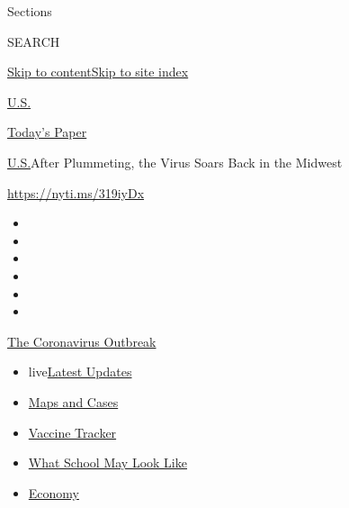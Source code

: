 Sections

SEARCH

\protect\hyperlink{site-content}{Skip to
content}\protect\hyperlink{site-index}{Skip to site index}

\href{https://www.nytimes3xbfgragh.onion/section/us}{U.S.}

\href{https://myaccount.nytimes3xbfgragh.onion/auth/login?response_type=cookie\&client_id=vi}{}

\href{https://www.nytimes3xbfgragh.onion/section/todayspaper}{Today's
Paper}

\href{/section/us}{U.S.}\textbar{}After Plummeting, the Virus Soars Back
in the Midwest

\url{https://nyti.ms/319iyDx}

\begin{itemize}
\item
\item
\item
\item
\item
\item
\end{itemize}

\href{https://www.nytimes3xbfgragh.onion/news-event/coronavirus?action=click\&pgtype=Article\&state=default\&region=TOP_BANNER\&context=storylines_menu}{The
Coronavirus Outbreak}

\begin{itemize}
\tightlist
\item
  live\href{https://www.nytimes3xbfgragh.onion/2020/08/01/world/coronavirus-covid-19.html?action=click\&pgtype=Article\&state=default\&region=TOP_BANNER\&context=storylines_menu}{Latest
  Updates}
\item
  \href{https://www.nytimes3xbfgragh.onion/interactive/2020/us/coronavirus-us-cases.html?action=click\&pgtype=Article\&state=default\&region=TOP_BANNER\&context=storylines_menu}{Maps
  and Cases}
\item
  \href{https://www.nytimes3xbfgragh.onion/interactive/2020/science/coronavirus-vaccine-tracker.html?action=click\&pgtype=Article\&state=default\&region=TOP_BANNER\&context=storylines_menu}{Vaccine
  Tracker}
\item
  \href{https://www.nytimes3xbfgragh.onion/interactive/2020/07/29/us/schools-reopening-coronavirus.html?action=click\&pgtype=Article\&state=default\&region=TOP_BANNER\&context=storylines_menu}{What
  School May Look Like}
\item
  \href{https://www.nytimes3xbfgragh.onion/live/2020/07/31/business/stock-market-today-coronavirus?action=click\&pgtype=Article\&state=default\&region=TOP_BANNER\&context=storylines_menu}{Economy}
\end{itemize}

